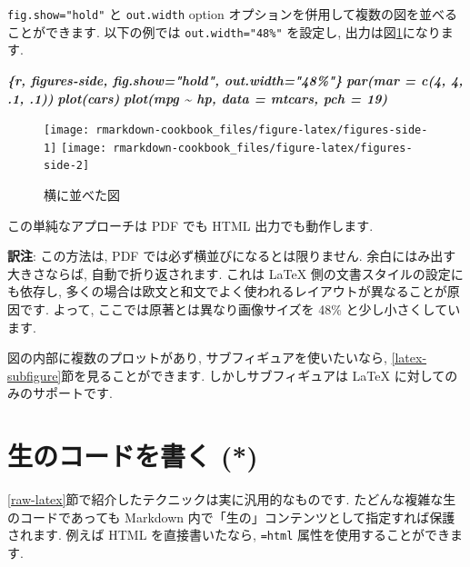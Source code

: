\documentclass[
  11pt,
]{bxjsreport}
\newenvironment{Shaded}{\begin{snugshade}}{\end{snugshade}}
\newcommand{\InformationTok}[1]{\textcolor[rgb]{0.56,0.35,0.01}{\textbf{\textit{#1}}}}
\begin{document}
\texttt{fig.show="hold"} と \texttt{out.width} option オプションを併用して複数の図を並べることができます. 以下の例では \texttt{out.width="48\%"} を設定し, 出力は図\ref{fig:figures-side}になります.

\begin{Shaded}
\begin{Highlighting}[]
\InformationTok{\textasciigrave{}\textasciigrave{}\textasciigrave{}\{r, figures{-}side, fig.show="hold", out.width="48\%"\}}
\InformationTok{par(mar = c(4, 4, .1, .1))}
\InformationTok{plot(cars)}
\InformationTok{plot(mpg \textasciitilde{} hp, data = mtcars, pch = 19)}
\InformationTok{\textasciigrave{}\textasciigrave{}\textasciigrave{}}
\end{Highlighting}
\end{Shaded}

\begin{figure}

{\centering \texttt{[image: rmarkdown-cookbook\_files/figure-latex/figures-side-1]} \texttt{[image: rmarkdown-cookbook\_files/figure-latex/figures-side-2]} 

}

\caption{横に並べた図}\label{fig:figures-side}
\end{figure}

この単純なアプローチは PDF でも HTML 出力でも動作します.

\textbf{訳注}: この方法は, PDF では必ず横並びになるとは限りません. 余白にはみ出す大きさならば, 自動で折り返されます. これは LaTeX 側の文書スタイルの設定にも依存し, 多くの場合は欧文と和文でよく使われるレイアウトが異なることが原因です. よって, ここでは原著とは異なり画像サイズを 48\% と少し小さくしています.

図の内部に複数のプロットがあり, サブフィギュアを使いたいなら, \ref{latex-subfigure}節を見ることができます. しかしサブフィギュアは LaTeX に対してのみのサポートです.

\hypertarget{raw-content}{%
\section{生のコードを書く (*)}\label{raw-content}}

\ref{raw-latex}節で紹介したテクニックは実に汎用的なものです. たどんな複雑な生のコードであっても Markdown 内で「生の」コンテンツとして指定すれば保護されます. 例えば HTML を直接書いたなら, \texttt{=html} 属性を使用することができます.
\end{document}
